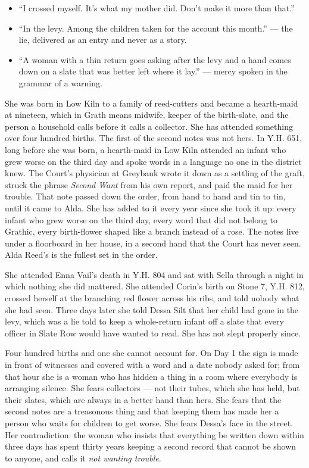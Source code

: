 \documentclass{design/chronicle}
\begin{document}
{\begin{itemize}[leftmargin=1.4em,itemsep=1pt,topsep=3pt,parsep=0pt]
\item “I crossed myself. It’s what my mother did. Don’t make it more than that.”

\item “In the levy. Among the children taken for the account this month.” --- the lie, delivered as an entry and never as a story.

\item “A woman with a thin return goes asking after the levy and a hand comes down on a slate that was better left where it lay.” --- mercy spoken in the grammar of a warning.

\end{itemize}

She was born in Low Kiln to a family of reed-cutters and became a hearth-maid at nineteen, which in Grath means midwife, keeper of the birth-slate, and the person a household calls before it calls a collector. She has attended something over four hundred births. The first of the second notes was not hers. In Y.H. 651, long before she was born, a hearth-maid in Low Kiln attended an infant who grew worse on the third day and spoke words in a language no one in the district knew. The Court’s physician at Greybank wrote it down as a settling of the graft, struck the phrase \emph{Second Want} from his own report, and paid the maid for her trouble. That note passed down the order, from hand to hand and tin to tin, until it came to Alda. She has added to it every year since she took it up: every infant who grew worse on the third day, every word that did not belong to Grathic, every birth-flower shaped like a branch instead of a rose. The notes live under a floorboard in her house, in a second hand that the Court has never seen. Alda Reed’s is the fullest set in the order.

She attended Enna Vail’s death in Y.H. 804 and sat with Sella through a night in which nothing she did mattered. She attended Corin’s birth on Stone 7, Y.H. 812, crossed herself at the branching red flower across his ribs, and told nobody what she had seen. Three days later she told Dessa Silt that her child had gone in the levy, which was a lie told to keep a whole-return infant off a slate that every officer in Slate Row would have wanted to read. She has not slept properly since.

Four hundred births and one she cannot account for. On Day 1 the sign is made in front of witnesses and covered with a word and a date nobody asked for; from that hour she is a woman who has hidden a thing in a room where everybody is arranging silence. She fears collectors — not their tubes, which she has held, but their slates, which are always in a better hand than hers. She fears that the second notes are a treasonous thing and that keeping them has made her a person who waits for children to get worse. She fears Dessa’s face in the street. Her contradiction: the woman who insists that everything be written down within three days has spent thirty years keeping a second record that cannot be shown to anyone, and calls it \emph{not wanting trouble}.

}
\end{document}
